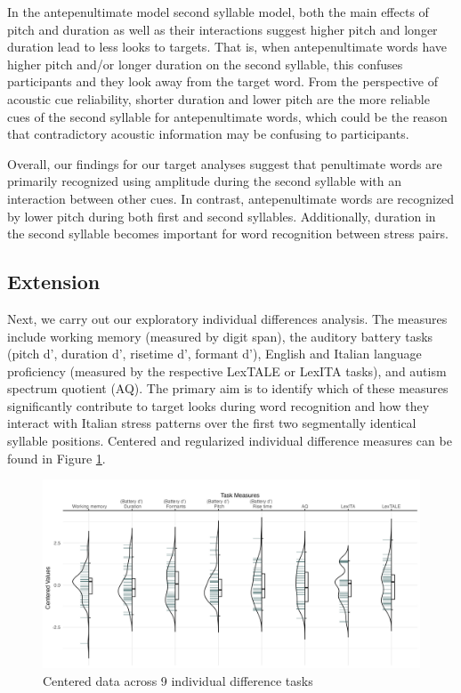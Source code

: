 In the antepenultimate model second syllable model, both the main effects of pitch and duration as well as their interactions suggest higher pitch and longer duration lead to less looks to targets. That is, when antepenultimate words have higher pitch and/or longer duration on the second syllable, this confuses participants and they look away from the target word. From the perspective of acoustic cue reliability, shorter duration and lower pitch are the more reliable cues of the second syllable for antepenultimate words, which could be the reason that contradictory acoustic information may be confusing to participants. 

Overall, our findings for our target analyses suggest that penultimate words are primarily recognized using amplitude during the second syllable with an interaction between other cues. In contrast, antepenultimate words are recognized by lower pitch during both first and second syllables. Additionally, duration in the second syllable becomes important for word recognition between stress pairs.

\subsection{Extension}

Next, we carry out our exploratory individual differences analysis. The measures include working memory (measured by digit span), the auditory battery tasks (pitch d', duration d', risetime d', formant d'), English and Italian language proficiency (measured by the respective LexTALE or LexITA tasks), and autism spectrum quotient (AQ). The primary aim is to identify which of these measures significantly contribute to target looks during word recognition and how they interact with Italian stress patterns over the first two segmentally identical syllable positions. Centered and regularized individual difference measures can be found in Figure \ref{fig:plot_raw_task}.

\begin{figure}[H]
  \centering
  \includegraphics[width=1\linewidth]{visuals/plot_raw_task.jpeg}
  \caption{Centered data across 9 individual difference tasks}
  \label{fig:plot_raw_task}
\end{figure}



